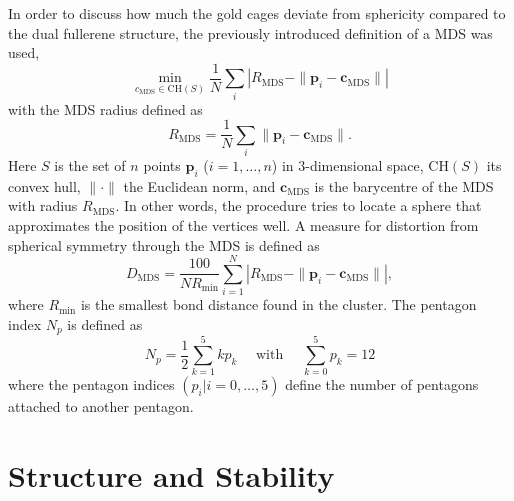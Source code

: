In order to discuss how much the gold cages deviate from sphericity compared to
the dual fullerene structure, the previously introduced definition of a \ac{MDS}
was used,\autocite{Schwerdtfeger_Programfullerenesoftware_2013}
%
\begin{equation} 
\min\limits_{c_\mathrm{MDS} \in \mathrm{CH}(S)} \frac{1}{N} \sum _{i} \left|R_\mathrm{MDS} -\| \mathbf{p}_{i}-\mathbf{c}_\mathrm{MDS} \| \right|  
\end{equation}
with the \ac{MDS} radius defined as
\begin{equation} 
	R_{\mathrm{MDS}} =\frac{1}{N} \sum _{i}\| \mathbf{p}_{i} -\mathbf{c}_{\mathrm{MDS}} \|. 
	\label{eq:RMDS}
\end{equation}
%
Here $S$ is the set of $n$ points $\mathbf{p}_i$ ($i=1,\ldots ,n$) in
$3$-dimensional space, $\mathrm{CH}(S)$ its convex hull, $\|\cdot\| $ the
Euclidean norm, and $\mathbf{c}_\mathrm{MDS}$ is the barycentre of the \ac{MDS}
with radius $R_\mathrm{MDS}$. In other words, the procedure tries to locate a
sphere that approximates the position of the vertices well. A measure for
distortion from spherical symmetry through the
\ac{MDS} is defined as\autocite{Schwerdtfeger_Programfullerenesoftware_2013}
%
\begin{equation}
  \label{eq:DMDS}
  D_{\mathrm{MDS}} = \frac{100}{N R_\mathrm{min}} \sum_{i=1}^N \left|R_{\mathrm{MDS}} - \|\mathbf{p}_i - \mathbf{c}_{\mathrm{MDS}}\| \right|,
\end{equation}
where $R_\mathrm{min}$ is the smallest bond distance found in the cluster. The pentagon index $N_p$ is defined as
\begin{equation}
  \label{pentindex}
  N_p = \frac{1}{2}\sum_{k=1}^{5} kp_k \quad \text{ with } \quad  \sum_{k=0}^{5} p_k = 12
\end{equation}
%
where the pentagon indices $(p_i | i=0, \dots , 5)$ define the number of
pentagons attached to another pentagon.\autocite{Fowler-atlas-2006}

\section{Structure and Stability}

